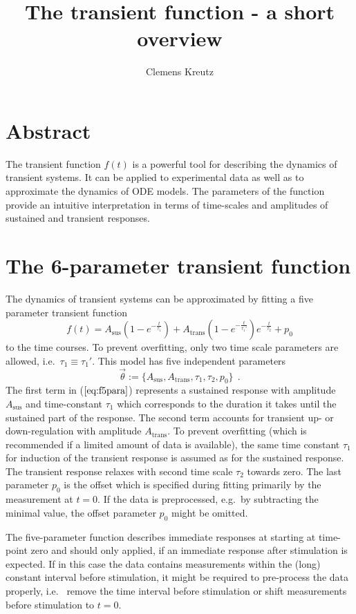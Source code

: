 \documentclass[pdftex, a4paper]{scrartcl}	%
\title{The transient function - a short overview}
\author{Clemens Kreutz}
\date{}
\begin{document}
\maketitle
\section{Abstract}
The transient function $f(t)$ is a powerful tool for describing the dynamics of transient systems.
It can be applied to experimental data as well as to approximate the dynamics of ODE models.
The parameters of the function provide an intuitive interpretation in terms of time-scales and amplitudes of
sustained and transient responses.


\section{The 6-parameter transient function}
The dynamics of transient systems can be approximated by fitting a five parameter transient function
\begin{equation}  \label{eq:f5para}
	f(t) =  A_{\text{sus}} \left( 1-  e^{-\frac t {\tau_1}}\right)   + A_{\text{trans}} \left(1-e^{-\frac t {\tau_1'}}\right) e^{-\frac t {\tau_2}} + p_0 
\end{equation}
to the time courses.
To prevent overfitting, only two time scale parameters are allowed, i.e.~$\tau_1\equiv\tau_1'$.
This model has five independent parameters 
\begin{equation}
	\vec \theta := \{A_\text{sus},A_\text{trans},\tau_1, \tau_2, p_0\}\:\:.
\end{equation}
The first term in ($\ref{eq:f5para}$) represents a sustained response with amplitude $A_\text{sus}$ and time-constant $\tau_1$ which corresponds to the duration it takes until the sustained part of the response.
The second term accounts for transient up- or down-regulation with amplitude $A_\text{trans}$.
To prevent overfitting (which is recommended if a limited amount of data is available),
the same time constant $\tau_1$ for induction of the transient response is assumed as for the sustained response. 
The transient response relaxes with second time scale $\tau_2$ towards zero.
The last parameter $p_0$ is the offset which is specified during fitting primarily by the measurement at $t=0$.
If the data is preprocessed, e.g.~by subtracting the minimal value, the offset parameter $p_0$ might be omitted.

The five-parameter function describes immediate responses at starting at time-point zero and should only applied, 
if an immediate response after stimulation is expected.
If in this case the data contains measurements within the (long) constant interval before stimulation,
it might be required to pre-process the data properly, i.e.~ remove the time interval before stimulation or shift
measurements before stimulation to $t=0$.
\end{document}

